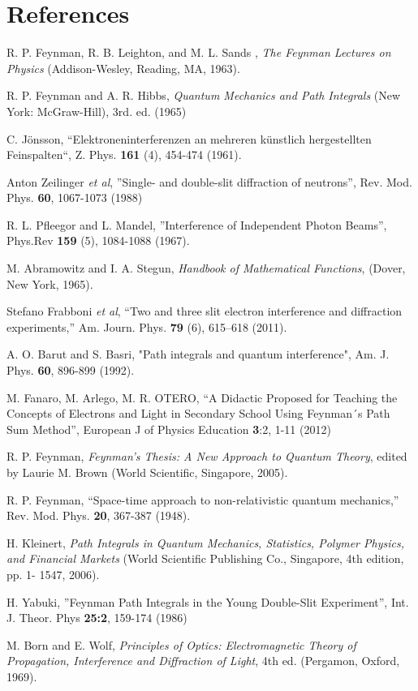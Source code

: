 \documentclass[12pt,aps,prb,preprint]{revtex4-1}   %
\begin{document}
\section*{References}
\begin{thebibliography}{10}

 R. P. Feynman, R. B. Leighton, and M. L. Sands ,
\textsl{The Feynman Lectures on Physics} (Addison-Wesley, Reading, MA, 1963).

 R. P. Feynman and A. R. Hibbs,
\textsl{Quantum Mechanics and Path Integrals} (New York: McGraw-Hill), 3rd. ed. (1965)

 C. J\"onsson, ``Elektroneninterferenzen an mehreren k\"unstlich hergestellten
Feinspalten``, Z. Phys. \textbf{161} (4), 454-474 (1961).

 Anton Zeilinger \textsl{et al}, ''Single- and double-slit diffraction of neutrons'', 
Rev. Mod. Phys. \textbf{60}, 1067-1073 (1988) 

 R. L. Pfleegor and L. Mandel, ''Interference of Independent Photon Beams'', 
Phys.Rev \textbf{159} (5), 1084-1088 (1967).

 M. Abramowitz and I. A. Stegun, \textsl{Handbook of Mathematical Functions},
(Dover, New York, 1965).

 Stefano Frabboni \textsl{et al},
``Two and three slit electron interference and diffraction
experiments,'' Am. Journ. Phys. {\bf 79} (6), 615--618 (2011).

 A. O. Barut and S. Basri, "Path integrals and quantum interference",
Am. J. Phys. \textbf{60}, 896-899 (1992).

 M. Fanaro, M. Arlego, M. R. OTERO, ``A Didactic Proposed for Teaching the Concepts of
Electrons and Light in Secondary School Using Feynman´s Path Sum Method'', European J of Physics Education
\textbf{3}:2, 1-11 (2012)

 R. P. Feynman, \textsl{Feynman's Thesis: A New Approach to Quantum Theory},
edited by Laurie M. Brown (World Scientific, Singapore, 2005).

 R. P. Feynman, ``Space-time approach to non-relativistic quantum mechanics,''
Rev. Mod. Phys. \textbf{20}, 367-387 (1948).

 H. Kleinert, 
\textit{Path Integrals in Quantum Mechanics, Statistics, Polymer Physics, and Financial Markets} 
(World Scientific Publishing Co., Singapore, 4th edition, pp. 1- 1547, 2006).

 H. Yabuki, ''Feynman Path Integrals in the Young Double-Slit Experiment'', 
Int. J. Theor. Phys \textbf{25:2}, 159-174 (1986) 

 M. Born and E. Wolf, \textsl{Principles of Optics:
Electromagnetic Theory of Propagation, Interference and Diffraction of Light},
4th ed. (Pergamon, Oxford, 1969).


\end{thebibliography}
\end{document}
